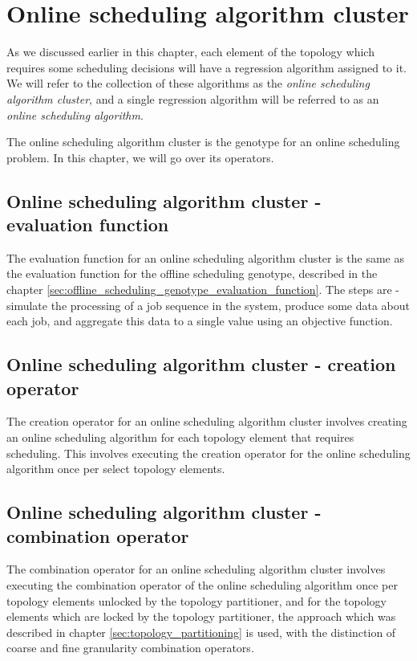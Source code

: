 \section{Online scheduling algorithm cluster}
\label{sec:online_scheduling_algorithm_cluster}

As we discussed earlier in this chapter, each element of the topology which requires some scheduling decisions will have a regression algorithm assigned to it. We will refer to the collection of these algorithms as the \textit{online scheduling algorithm cluster}, and a single regression algorithm will be referred to as an \textit{online scheduling algorithm}.

The online scheduling algorithm cluster is the genotype for an online scheduling problem. In this chapter, we will go over its operators.

\subsection{Online scheduling algorithm cluster - evaluation function}
The evaluation function for an online scheduling algorithm cluster is the same as the evaluation function for the offline scheduling genotype, described in the chapter \ref{sec:offline_scheduling_genotype_evaluation_function}. The steps are - simulate the processing of a job sequence in the system, produce some data about each job, and aggregate this data to a single value using an objective function.

\subsection{Online scheduling algorithm cluster - creation operator}
The creation operator for an online scheduling algorithm cluster involves creating an online scheduling algorithm for each topology element that requires scheduling. This involves executing the creation operator for the online scheduling algorithm once per select topology elements.

\subsection{Online scheduling algorithm cluster - combination operator}
The combination operator for an online scheduling algorithm cluster involves executing the combination operator of the online scheduling algorithm once per topology elements unlocked by the topology partitioner, and for the topology elements which are locked by the topology partitioner, the approach which was described in chapter \ref{sec:topology_partitioning} is used, with the distinction of coarse and fine granularity combination operators.

